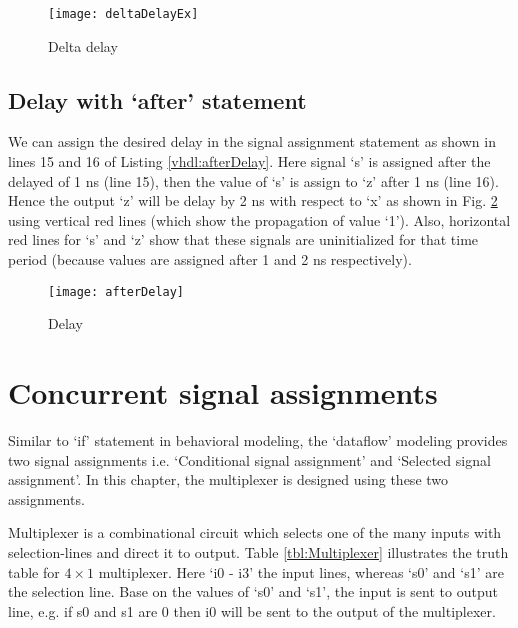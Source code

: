 

\begin{figure}[!h]
	\centering
	\texttt{[image: deltaDelayEx]}
	\caption{Delta delay}
	\label{fig:deltaDelayEx}
\end{figure}

\subsection{Delay with `after' statement}
We can assign the desired delay in the signal assignment statement as shown in lines 15 and 16 of Listing \ref{vhdl:afterDelay}. Here signal `s' is assigned after the delayed of 1 ns (line 15), then the value of `s' is assign to `z' after 1 ns (line 16). Hence the output `z' will be delay by 2 ns with respect to `x' as shown in Fig. \ref{fig:afterDelay} using vertical red lines (which show the propagation of value `1'). Also, horizontal red lines for `s' and `z' show that these signals are uninitialized for that time period (because values are assigned after 1 and 2 ns respectively). 




\begin{figure}[!h]
	\centering
	\texttt{[image: afterDelay]}
	\caption{Delay}
	\label{fig:afterDelay}
\end{figure}

\section{Concurrent signal assignments}
Similar to `if' statement in behavioral modeling, the `dataflow' modeling provides two signal assignments i.e. `Conditional signal assignment' and `Selected signal assignment'. In this chapter, the multiplexer is designed using these two assignments. 

Multiplexer is a combinational circuit which selects one of the many inputs with selection-lines and direct it to output. Table \ref{tbl:Multiplexer} illustrates the truth table for $4\times 1$ multiplexer. Here `i0 - i3' the input lines, whereas `s0' and `s1' are the selection line. Base on the values of `s0' and `s1', the input is sent to output line, e.g. if s0 and s1 are 0 then i0 will be sent to the output of the multiplexer.

